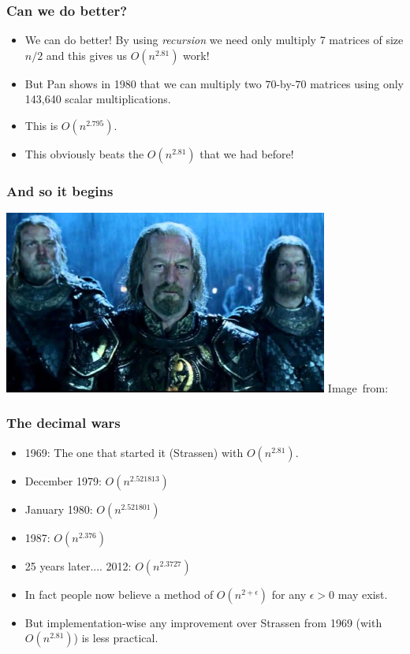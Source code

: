 \begin{frame}
	\frametitle{Can we do better?}
	
	\begin{itemize}
		\item We can do better! By using \textit{recursion} we need only multiply 7 matrices of size $n/2$ and this gives us
			$O(n^{2.81})$ work!
			\pause
		\item But Pan shows in 1980 that we can multiply two $70$-by-$70$ matrices using \alert{only} 143,640 scalar
			multiplications.
		\item This is $O(n^{2.795})$.
			\pause
		\item This obviously beats the $O(n^{2.81})$ that we had before!
	\end{itemize}
\end{frame}

\begin{frame}
	\frametitle{And so it begins}
	\begin{center}
		\includegraphics[width=0.8\textwidth]{figures/soitbegins.jpg}
		\hspace*{15pt}\hbox{\scriptsize Image from: }
	\end{center}
\end{frame}

\begin{frame}
	\frametitle{The decimal wars}
	\begin{itemize}
		\item 1969: The one that started it (Strassen) with $O(n^{2.81})$.
			\pause
		\item December 1979: $O(n^{2.521813})$
			\pause
		\item January 1980: \pause $O(n^{2.521801})$
			\pause
		\item 1987: \pause $O(n^{2.376})$
			\pause
		\item 25 years later.... 2012: \pause $O(n^{2.3727})$
			\pause
		\item In fact people now believe a method of $O(n^{2+\epsilon})$ for any $\epsilon > 0$ may exist.
			\pause
		\item But implementation-wise any improvement over Strassen from 1969 (with $O(n^{2.81})$) is less practical.
	\end{itemize}
\end{frame}


